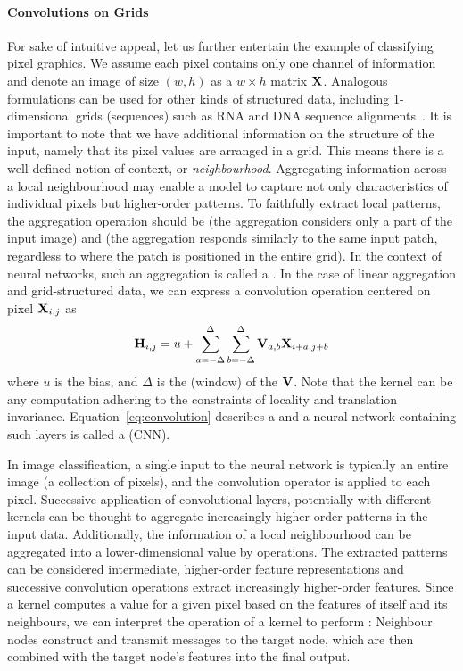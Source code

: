 \documentclass[
	fontsize=10pt, %
	twoside=true, %
	secnumdepth=1, %
  toc=indentunnumbered %
]{kaobook}
\begin{document}
\paragraph{Convolutions on Grids}
For sake of intuitive appeal, let us further entertain the example of
classifying pixel graphics. We assume each pixel contains only one channel of
information and denote an image of size $(w,h)$ as a $w \times h$ matrix $\mathbf{X}$. Analogous formulations can be used for other kinds of structured data,
including 1-dimensional grids (sequences) such as RNA and DNA sequence
alignments~\cite{flagel_UnreasonableEffectivenessConvolutional_2019,aoki_ConvolutionalNeuralNetworks_2018}.
It is important to note that we have additional information on the structure of
the input,
namely that its pixel values are arranged in a grid. This means there is a
well-defined notion of context, or \textit{neighbourhood}.
%
Aggregating information across a local neighbourhood may enable
a model to capture not only characteristics of individual pixels but
higher-order patterns. To faithfully extract local patterns, the aggregation
operation should be  (the aggregation considers only a part of the
input image) and  (the aggregation responds
similarly to the same input patch, regardless to where the patch is positioned in the
entire grid). In the context of neural networks, such an aggregation is called a
 \cite{zhang_dive_nodate}. In the case of linear aggregation
and grid-structured data, we can express a convolution operation centered on pixel $\mathbf{X}_{i,j}$ as
\begin{align}
  \mathbf{H}_{i,j} = u + \sum_{a= -\Delta}^\Delta \sum_{b = -\Delta}^\Delta \mathbf{V}_{a,b} \mathbf{X}_{i+a,j+b}
  \label{eq:convolution}
\end{align}
where $u$ is the bias, and $\Delta$ is the (window)  of the
 $\mathbf{V}$.
%
Note that the kernel can be any
computation adhering to the constraints of locality and translation invariance.
%
Equation~\ref{eq:convolution} describes a
 and a neural network containing such layers is called
a  (CNN).

In image classification, a single input to the neural network is typically an
entire image (a collection of pixels), and the convolution operator is applied
to each pixel. 
%
Successive application of convolutional layers,
potentially with different kernels can be thought to aggregate increasingly
higher-order patterns in the input data. Additionally, the information of a
local neighbourhood can be aggregated into a lower-dimensional value by
 operations.
%
The extracted patterns can be
considered intermediate, higher-order feature representations and successive
convolution operations extract increasingly higher-order features.
%
Since a kernel computes a value for a given pixel based on the features of
itself and its neighbours, we can interpret the operation of a kernel to perform
: Neighbour nodes construct and transmit messages to the
target node, which are then combined with the target node's features into the
final output.
\end{document}
